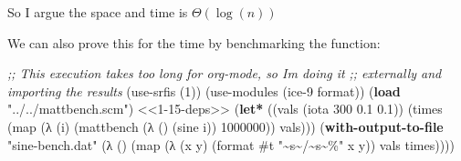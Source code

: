 \documentclass[
]{article}
\newenvironment{Shaded}{}{}
\newcommand{\CommentTok}[1]{\textcolor[rgb]{0.38,0.63,0.69}{\textit{#1}}}
\newcommand{\DecValTok}[1]{\textcolor[rgb]{0.25,0.63,0.44}{#1}}
\newcommand{\FloatTok}[1]{\textcolor[rgb]{0.25,0.63,0.44}{#1}}
\newcommand{\KeywordTok}[1]{\textcolor[rgb]{0.00,0.44,0.13}{\textbf{#1}}}
\newcommand{\NormalTok}[1]{#1}
\newcommand{\StringTok}[1]{\textcolor[rgb]{0.25,0.44,0.63}{#1}}
\begin{document}
So I argue the space and time is \(\Theta(\log(n))\)

We can also prove this for the time by benchmarking the function:

\hypertarget{1-15-sine-bench}{%
\label{1-15-sine-bench}}%
\begin{Shaded}
\begin{Highlighting}[numbers=left,,]
\CommentTok{;; This execution takes too long for org{-}mode, so I\textquotesingle{}m doing it}
\CommentTok{;; externally and importing the results}
\NormalTok{(use{-}srfis \textquotesingle{}(}\DecValTok{1}\NormalTok{))}
\NormalTok{(use{-}modules (ice{-}9 format))}
\NormalTok{(}\KeywordTok{load} \StringTok{"../../mattbench.scm"}\NormalTok{)}
\NormalTok{\textless{}\textless{}1{-}15{-}deps\textgreater{}\textgreater{}}
\NormalTok{(}\KeywordTok{let*}\NormalTok{ ((vals (iota }\DecValTok{300} \FloatTok{0.1} \FloatTok{0.1}\NormalTok{))}
\NormalTok{       (times (map (λ (i)}
\NormalTok{                     (mattbench (λ () (sine i)) }\DecValTok{1000000}\NormalTok{))}
\NormalTok{                   vals)))}
\NormalTok{  (}\KeywordTok{with{-}output{-}to{-}file} \StringTok{"sine{-}bench.dat"}\NormalTok{ (λ ()}
\NormalTok{     (map (λ (x y)}
\NormalTok{           (format }\DecValTok{\#t} \StringTok{"\textasciitilde{}s\textasciitilde{}/\textasciitilde{}s\textasciitilde{}\%"}\NormalTok{ x y))}
\NormalTok{         vals times))))}
\end{Highlighting}
\end{Shaded}

\begin{Shaded}
\end{Shaded}
\end{document}
